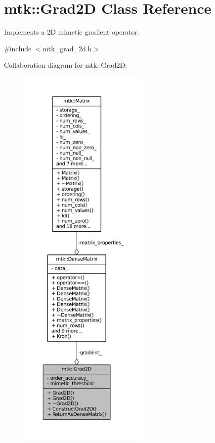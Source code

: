\hypertarget{classmtk_1_1Grad2D}{\section{mtk\+:\+:Grad2\+D Class Reference}
\label{classmtk_1_1Grad2D}
}


Implements a 2\+D mimetic gradient operator.  




{\ttfamily \#include $<$mtk\+\_\+grad\+\_\+2d.\+h$>$}



Collaboration diagram for mtk\+:\+:Grad2\+D\+:\nopagebreak
\begin{figure}[H]
\begin{center}
\leavevmode
\includegraphics[height=550pt]{classmtk_1_1Grad2D__coll__graph}
\end{center}
\end{figure}

